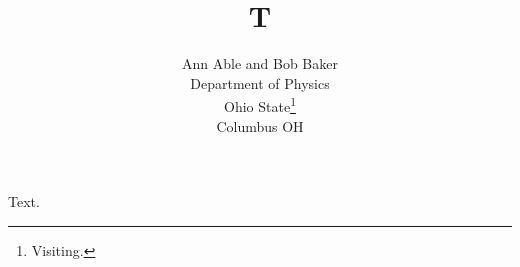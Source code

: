 \documentclass{article}
\begin{document}
\title{T}
\author{Ann Able and Bob Baker\\ Department of Physics\\ Ohio State\footnote{Visiting.}\\ Columbus OH}
\maketitle
Text.
\end{document}
